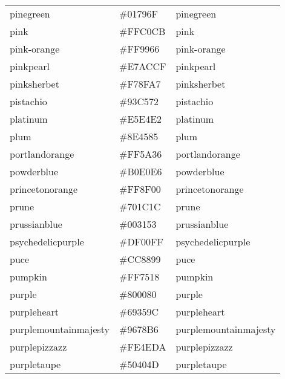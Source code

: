 \documentclass[
]{article}
\begin{document}
\begin{longtable}[]{@{}lll@{}}
pinegreen & \colorbox[rgb]{0.0,0.47,0.44}{\#01796F} &
\textcolor[rgb]{0.0,0.47,0.44}{pinegreen             }\tabularnewline
pink & \colorbox[rgb]{1.0,0.75,0.8}{\#FFC0CB} &
\textcolor[rgb]{1.0,0.75,0.8}{pink                  }\tabularnewline
pink-orange & \colorbox[rgb]{1.0,0.6,0.4}{\#FF9966} &
\textcolor[rgb]{1.0,0.6,0.4}{pink-orange           }\tabularnewline
pinkpearl & \colorbox[rgb]{0.91,0.67,0.81}{\#E7ACCF} &
\textcolor[rgb]{0.91,0.67,0.81}{pinkpearl             }\tabularnewline
pinksherbet & \colorbox[rgb]{0.97,0.56,0.65}{\#F78FA7} &
\textcolor[rgb]{0.97,0.56,0.65}{pinksherbet           }\tabularnewline
pistachio & \colorbox[rgb]{0.58,0.77,0.45}{\#93C572} &
\textcolor[rgb]{0.58,0.77,0.45}{pistachio             }\tabularnewline
platinum & \colorbox[rgb]{0.9,0.89,0.89}{\#E5E4E2} &
\textcolor[rgb]{0.9,0.89,0.89}{platinum              }\tabularnewline
plum & \colorbox[rgb]{0.56,0.27,0.52}{\#8E4585} &
\textcolor[rgb]{0.56,0.27,0.52}{plum                  }\tabularnewline
portlandorange & \colorbox[rgb]{1.0,0.35,0.21}{\#FF5A36} &
\textcolor[rgb]{1.0,0.35,0.21}{portlandorange        }\tabularnewline
powderblue & \colorbox[rgb]{0.69,0.88,0.9}{\#B0E0E6} &
\textcolor[rgb]{0.69,0.88,0.9}{powderblue            }\tabularnewline
princetonorange & \colorbox[rgb]{1.0,0.56,0.0}{\#FF8F00} &
\textcolor[rgb]{1.0,0.56,0.0}{princetonorange       }\tabularnewline
prune & \colorbox[rgb]{0.44,0.11,0.11}{\#701C1C} &
\textcolor[rgb]{0.44,0.11,0.11}{prune                 }\tabularnewline
prussianblue & \colorbox[rgb]{0.0,0.19,0.33}{\#003153} &
\textcolor[rgb]{0.0,0.19,0.33}{prussianblue          }\tabularnewline
psychedelicpurple & \colorbox[rgb]{0.87,0.0,1.0}{\#DF00FF} &
\textcolor[rgb]{0.87,0.0,1.0}{psychedelicpurple     }\tabularnewline
puce & \colorbox[rgb]{0.8,0.53,0.6}{\#CC8899} &
\textcolor[rgb]{0.8,0.53,0.6}{puce                  }\tabularnewline
pumpkin & \colorbox[rgb]{1.0,0.46,0.09}{\#FF7518} &
\textcolor[rgb]{1.0,0.46,0.09}{pumpkin               }\tabularnewline
purple & \colorbox[rgb]{0.5,0.0,0.5}{\#800080} &
\textcolor[rgb]{0.5,0.0,0.5}{purple                }\tabularnewline
purpleheart & \colorbox[rgb]{0.41,0.21,0.61}{\#69359C} &
\textcolor[rgb]{0.41,0.21,0.61}{purpleheart           }\tabularnewline
purplemountainmajesty & \colorbox[rgb]{0.59,0.47,0.71}{\#9678B6} &
\textcolor[rgb]{0.59,0.47,0.71}{purplemountainmajesty }\tabularnewline
purplepizzazz & \colorbox[rgb]{1.0,0.31,0.85}{\#FE4EDA} &
\textcolor[rgb]{1.0,0.31,0.85}{purplepizzazz         }\tabularnewline
purpletaupe & \colorbox[rgb]{0.31,0.25,0.3}{\#50404D} &
\textcolor[rgb]{0.31,0.25,0.3}{purpletaupe           }\tabularnewline

\end{longtable}
\end{document}
